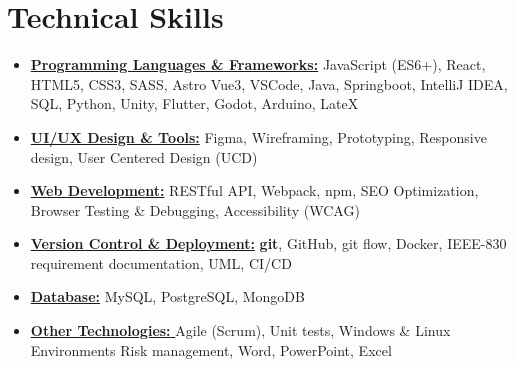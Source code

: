 \documentclass[11pt,a4paper,sans]{moderncv}
\newcommand{\sectionMargin}{-3mm}
\begin{document}
\section{Technical Skills}{
\begin{itemize}[label=\textbullet, noitemsep]
  \item {\underline{\textbf{Programming Languages \& Frameworks:}} 
    {JavaScript (ES6+)},
    {React},
    {HTML5},
    {CSS3},
    {SASS},
    {Astro}
    {Vue3},
    {VSCode},
    {Java},
    {Springboot},
    {IntelliJ IDEA},
    {SQL},
    {Python},
    {Unity},
    {Flutter},
    {Godot},
    {Arduino},
    {LateX}
  }
  \item {\underline{\textbf{UI/UX Design \& Tools:}}
    {Figma},
    {Wireframing},
    {Prototyping},
    {Responsive design},
    {User Centered Design (UCD)}
  }
  \item {\underline{\textbf{Web Development:}}
    {RESTful API},
    {Webpack},
    {npm},
    {SEO Optimization},
    {Browser Testing \& Debugging},
    {Accessibility (WCAG)}
  }
  \item {\underline{\textbf{Version Control \& Deployment:}}
    \textbf{git},
    {GitHub},
    {git flow},
    {Docker},
    {IEEE-830} requirement documentation,
    {UML},
    {CI/CD}
    }
  \item {\underline{\textbf{Database:}}
    {MySQL},
    {PostgreSQL},
    {MongoDB}
    }
  \item {\underline{\textbf{Other Technologies: }}
    {Agile (Scrum)},
    {Unit tests},
    {Windows \& Linux Environments}
    {Risk management},
    {Word},
    {PowerPoint},
    {Excel}
  }
\end{itemize}}

\vspace*{\sectionMargin}
\end{document}
